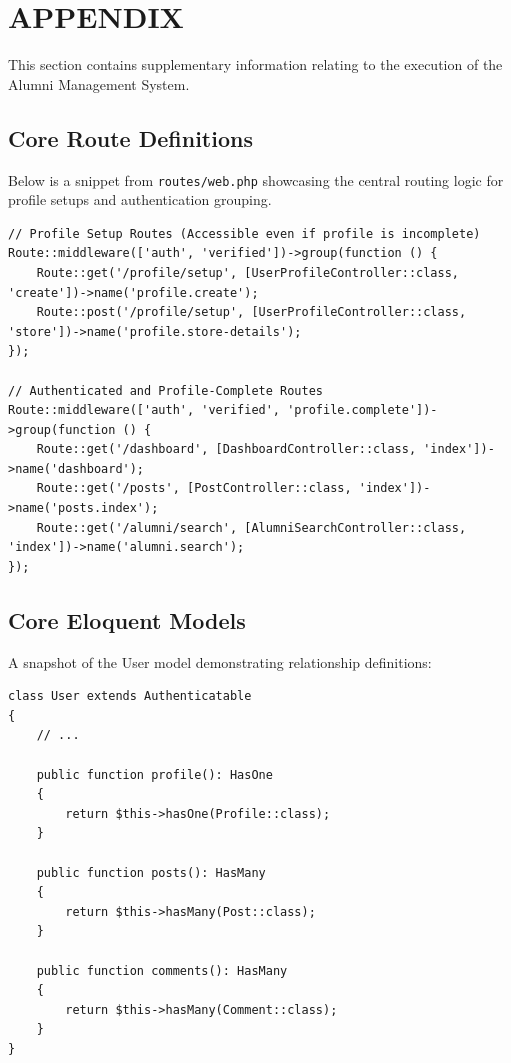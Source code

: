 \chapter{APPENDIX}

This section contains supplementary information relating to the execution of the Alumni Management System.

\section{Core Route Definitions}
Below is a snippet from \texttt{routes/web.php} showcasing the central routing logic for profile setups and authentication grouping.

\begin{lstlisting}[style=phpstyle]
// Profile Setup Routes (Accessible even if profile is incomplete)
Route::middleware(['auth', 'verified'])->group(function () {
    Route::get('/profile/setup', [UserProfileController::class, 'create'])->name('profile.create');
    Route::post('/profile/setup', [UserProfileController::class, 'store'])->name('profile.store-details');
});

// Authenticated and Profile-Complete Routes
Route::middleware(['auth', 'verified', 'profile.complete'])->group(function () {
    Route::get('/dashboard', [DashboardController::class, 'index'])->name('dashboard');
    Route::get('/posts', [PostController::class, 'index'])->name('posts.index');
    Route::get('/alumni/search', [AlumniSearchController::class, 'index'])->name('alumni.search');
});
\end{lstlisting}

\section{Core Eloquent Models}
A snapshot of the User model demonstrating relationship definitions:

\begin{lstlisting}[style=phpstyle]
class User extends Authenticatable
{
    // ...

    public function profile(): HasOne
    {
        return $this->hasOne(Profile::class);
    }

    public function posts(): HasMany
    {
        return $this->hasMany(Post::class);
    }

    public function comments(): HasMany
    {
        return $this->hasMany(Comment::class);
    }
}
\end{lstlisting}
